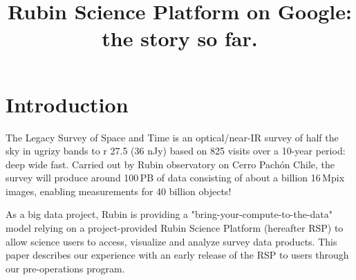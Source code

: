 \documentclass[11pt,twoside]{article}
\begin{document}
\title{Rubin Science Platform on Google: the story so far.}










\section{Introduction}

The Legacy Survey of Space and Time \citep{2019ApJ...873..111I} is an optical/near-IR survey of half the sky in ugrizy bands to r 27.5 (36 nJy) based on 825 visits over a 10-year period: deep wide fast.
Carried out by Rubin observatory on Cerro Pach\'{o}n Chile, the survey will produce around 100\,PB of data consisting of about a billion 16\,Mpix images, enabling measurements for 40 billion objects!

As a big data project, Rubin is providing a "bring-your-compute-to-the-data" model relying on a project-provided Rubin Science Platform (hereafter RSP) to allow science users to access, visualize and analyze survey data products.
This paper describes our experience with an early release of the RSP to users through our pre-operations program.
\end{document}
